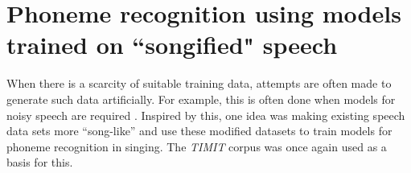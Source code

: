 \section{Phoneme recognition using models trained on ``songified" speech}

When there is a scarcity of suitable training data, attempts are often made to generate such data artificially. For example, this is often done when models for noisy speech are required \cite{ntimit}\cite{aurora}. Inspired by this, one idea was making existing speech data sets more ``song-like'' and use these modified datasets to train models for phoneme recognition in singing. The \textit{TIMIT} corpus was once again used as a basis for this.\\

